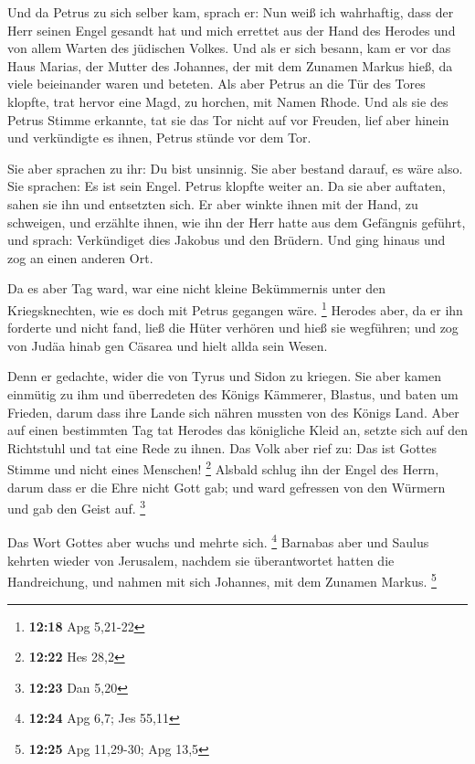  Und da Petrus zu sich selber kam, sprach er: Nun weiß
ich wahrhaftig, dass der Herr seinen Engel gesandt hat und mich errettet
aus der Hand des Herodes und von allem Warten des jüdischen Volkes.
 Und als er sich besann, kam er vor das Haus Marias, der
Mutter des Johannes, der mit dem Zunamen Markus hieß, da viele
beieinander waren und beteten.  Als aber Petrus an die
Tür des Tores klopfte, trat hervor eine Magd, zu horchen, mit Namen
Rhode.  Und als sie des Petrus Stimme erkannte, tat sie
das Tor nicht auf vor Freuden, lief aber hinein und verkündigte es
ihnen, Petrus stünde vor dem Tor.

 Sie aber sprachen zu ihr: Du bist unsinnig. Sie aber
bestand darauf, es wäre also. Sie sprachen: Es ist sein Engel.
 Petrus klopfte weiter an. Da sie aber auftaten, sahen
sie ihn und entsetzten sich.  Er aber winkte ihnen mit
der Hand, zu schweigen, und erzählte ihnen, wie ihn der Herr hatte aus
dem Gefängnis geführt, und sprach: Verkündiget dies Jakobus und den
Brüdern. Und ging hinaus und zog an einen anderen Ort.

 Da es aber Tag ward, war eine nicht kleine Bekümmernis
unter den Kriegsknechten, wie es doch mit Petrus gegangen wäre.
\footnote{\textbf{12:18} Apg 5,21-22}  Herodes aber, da
er ihn forderte und nicht fand, ließ die Hüter verhören und hieß sie
wegführen; und zog von Judäa hinab gen Cäsarea und hielt allda sein
Wesen.

 Denn er gedachte, wider die von Tyrus und Sidon zu
kriegen. Sie aber kamen einmütig zu ihm und überredeten des Königs
Kämmerer, Blastus, und baten um Frieden, darum dass ihre Lande sich
nähren mussten von des Königs Land.  Aber auf einen
bestimmten Tag tat Herodes das königliche Kleid an, setzte sich auf den
Richtstuhl und tat eine Rede zu ihnen.  Das Volk aber
rief zu: Das ist Gottes Stimme und nicht eines Menschen! \footnote{\textbf{12:22}
  Hes 28,2}  Alsbald schlug ihn der Engel des Herrn,
darum dass er die Ehre nicht Gott gab; und ward gefressen von den
Würmern und gab den Geist auf. \footnote{\textbf{12:23} Dan 5,20}

 Das Wort Gottes aber wuchs und mehrte sich. \footnote{\textbf{12:24}
  Apg 6,7; Jes 55,11}  Barnabas aber und Saulus kehrten
wieder von Jerusalem, nachdem sie überantwortet hatten die Handreichung,
und nahmen mit sich Johannes, mit dem Zunamen Markus. \footnote{\textbf{12:25}
  Apg 11,29-30; Apg 13,5}

